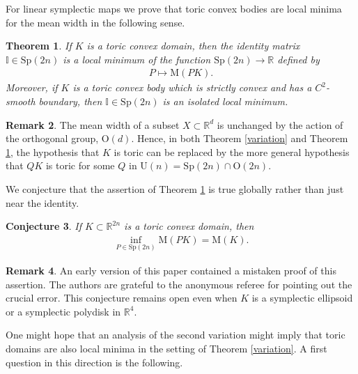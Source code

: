 \documentclass[12pt]{amsart}
\newtheorem{theorem}{Theorem}[section]
\newtheorem{conjecture}[theorem]{Conjecture}
\theoremstyle{definition}
\newtheorem{remark}[theorem]{Remark}
\newcommand{\II}{{\mathbb I}}
\newcommand{\RR}{{\mathbb R}}
\newcommand{\mw}{{{\mathrm {M}}}}
\begin{document}
For linear symplectic maps we prove that toric convex bodies are local minima for the mean width in the following sense.

\begin{theorem}\label{linear}
If $K$ is a toric convex domain, then the identity matrix  $\II \in \mathrm{Sp}(2n)$ is a local minimum of the function $\mathrm{Sp}(2n) \to \RR$ defined by 
\begin{align*}
 P \mapsto \mw(PK).
\end{align*}
Moreover, if $K$ is a toric convex body which is strictly convex and has a $C^2$-smooth boundary, then $\II \in \mathrm{Sp}(2n)$ is an isolated local minimum.
\end{theorem}






\begin{remark}\label{toric}
The mean width of a subset $X \subset \RR^d$ is unchanged by the action of the orthogonal group, $\mathrm{O}(d)$.  Hence, in both Theorem \ref{variation} and Theorem \ref{linear}, the hypothesis that $K$ is toric can be replaced by the more general hypothesis that $QK$ is toric for some $Q$ in $\mathrm{U}(n) = \mathrm{Sp}(2n) \cap \mathrm{O}(2n)$. 
\end{remark}

We conjecture that the assertion of Theorem \ref{linear} is true globally rather than just near the identity.

\begin{conjecture}
    If $K \subset \RR^{2n}$ is a toric convex domain, then \begin{align*}
  \inf_{P \in \mathrm{Sp}
(2n)} \mw (PK)  = \mw (K).
\end{align*}
\end{conjecture}

\begin{remark}An early version of this paper contained a mistaken proof of this assertion. The authors are grateful to the anonymous referee for pointing out the crucial error. This conjecture remains open even when $K$ is a symplectic ellipsoid or a symplectic polydisk in $\RR^4$. \end{remark}

\bigskip


One might hope that an analysis of the second variation might imply that toric domains are also local minima in the setting of  Theorem \ref{variation}. A first question in this direction is the following.
\end{document}
